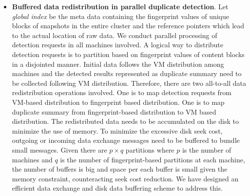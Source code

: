 \begin{itemize}
\item {\bf Buffered data redistribution in parallel duplicate detection}.  
Let {\em global index} be the meta data containing the fingerprint values of unique blocks of snapshots
in the entire cluster and  the reference pointers which lead to the actual location of raw data.
We conduct parallel processing of detection requests in all machines involved. 
A logical way to distribute detection requests is to partition based on fingerprint values of content blocks
in a  disjointed manner.
Initial data follows the VM distribution among machines and the detected results 
represented as  duplicate summary need to be collected following VM distribution. 
Therefore, there are two all-to-all data redistribution operations involved.
One is to map detection requests from VM-based distribution to fingerprint based distribution.  
One is to map duplicate summary from fingerprint-based distribution to VM based distribution.  
The redistributed data needs to be accumulated on the disk to minimize the use of memory.
To minimize the excessive disk seek cost, outgoing or incoming data exchange messages need to be buffered to bundle small messages.
Given there are $p\times q$ partitions where $p$ is the number of machines and $q$ is the number of fingerprint-based partitions
at each machine, the number of buffers is big and space per each buffer  is small given the memory constraint,
counteracting seek cost reduction.  
We have designed an efficient data exchange and disk data buffering  scheme to address this.


\end{itemize}


